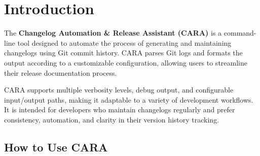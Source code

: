 \chapter{Introduction}
\label{ch:introduction}
\pagestyle{fancy}

The \textbf{Changelog Automation \& Release Assistant (CARA)} is a command-line tool designed to automate the process of generating and maintaining changelogs using Git commit history. CARA parses Git logs and formats the output according to a customizable configuration, allowing users to streamline their release documentation process.

CARA supports multiple verbosity levels, debug output, and configurable input/output paths, making it adaptable to a variety of development workflows. It is intended for developers who maintain changelogs regularly and prefer consistency, automation, and clarity in their version history tracking.


















\section{How to Use CARA}

